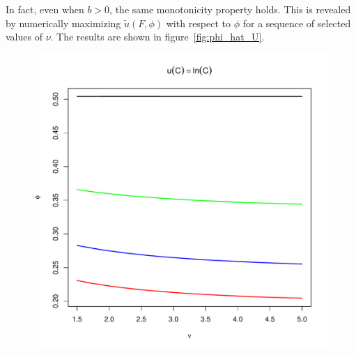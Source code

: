 \documentclass[11pt,a4]{amsart}
\newcommand{\wt}{\widetilde}
\newcommand{\1}{{\mathbf 1}}
\begin{document}
In fact, even when $b > 0$, the same monotonicity property holds. This
is revealed by numerically maximizing $\wt u(F, \phi)$ with
respect to $\phi$ for a sequence of selected values of $\nu$. The
results are shown in figure~\ref{fig:phi_hat_U}.
\begin{figure}[htb!]
  \begin{minipage}{0.5\linewidth}
    \includegraphics[width=\textwidth]{phi_hat_b_t_log.pdf}

\end{minipage}
\end{figure}
\end{document}
